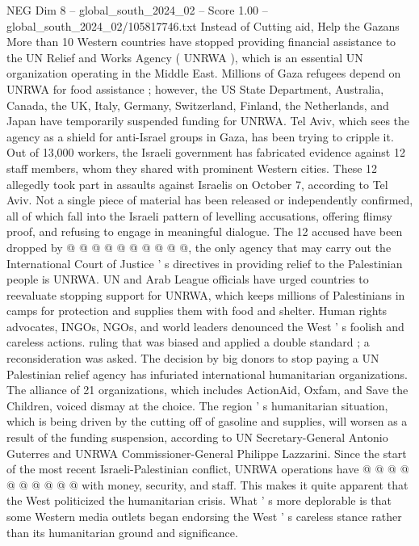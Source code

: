 \begin{textsample}{NEG Dim 8 – global\_south\_2024\_02 – Score 1.00 – global\_south\_2024\_02/105817746.txt}  \label{ex:f8_neg_258}
Instead of Cutting aid, Help the Gazans More than 10 Western countries have stopped providing financial assistance to the UN Relief and Works Agency ( UNRWA ), which is an essential UN organization operating in the Middle East.
Millions of Gaza refugees depend on UNRWA for food assistance ; however, the US State Department, Australia, Canada, the UK, Italy, Germany, Switzerland, Finland, the Netherlands, and Japan have temporarily suspended funding for UNRWA.
Tel Aviv, which sees the agency as a shield for anti-Israel groups in Gaza, has been trying to cripple it.
Out of 13,000 workers, the Israeli government has fabricated evidence against 12 staff members, whom they shared with prominent Western cities.
These 12 allegedly took part in assaults against Israelis on October 7, according to Tel Aviv.
Not a single piece of material has been released or independently confirmed, all of which fall into the Israeli pattern of levelling accusations, offering flimsy proof, and refusing to engage in meaningful dialogue.
The 12 accused have been dropped by @ @ @ @ @ @ @ @ @ @, the only agency that may carry out the International Court of Justice ' s directives in providing relief to the Palestinian people is UNRWA.
UN and Arab League officials have urged countries to reevaluate stopping support for UNRWA, which keeps millions of Palestinians in camps for protection and supplies them with food and shelter.
Human rights advocates, INGOs, NGOs, and world leaders denounced the West ' s foolish and careless actions. ruling that was biased and applied a double standard ; a reconsideration was asked.
The decision by big donors to stop paying a UN Palestinian relief agency has infuriated international humanitarian organizations.
The alliance of 21 organizations, which includes ActionAid, Oxfam, and Save the Children, voiced dismay at the choice.
The region ' s humanitarian situation, which is being driven by the cutting off of gasoline and supplies, will worsen as a result of the funding suspension, according to UN Secretary-General Antonio Guterres and UNRWA Commissioner-General Philippe Lazzarini.
Since the start of the most recent Israeli-Palestinian conflict, UNRWA operations have @ @ @ @ @ @ @ @ @ @ with money, security, and staff.
This makes it quite apparent that the West politicized the humanitarian crisis.
What ' s more deplorable is that some Western media outlets began endorsing the West ' s careless stance rather than its humanitarian ground and significance.

\end{textsample}
